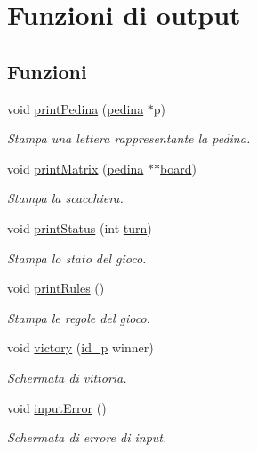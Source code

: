 \hypertarget{group__Output}{}\section{Funzioni di output}
\label{group__Output}
\subsection*{Funzioni}
\begin{DoxyCompactItemize}
\item 
void \hyperlink{group__Output_ga724261d45664de95115edbec3fec7aef}{print\+Pedina} (\hyperlink{ml__lib_8h_a71fee95122b31f5cb0b07d9c16ffa3a5}{pedina} $\ast$p)
\begin{DoxyCompactList}\small\item\em Stampa una lettera rappresentante la pedina. \end{DoxyCompactList}\item 
void \hyperlink{group__Output_gac5423849c2701b9adbd33225a8a20288}{print\+Matrix} (\hyperlink{ml__lib_8h_a71fee95122b31f5cb0b07d9c16ffa3a5}{pedina} $\ast$$\ast$\hyperlink{ml__main_8c_a62a3fe3d1df9ff58883b669f7f24e516}{board})
\begin{DoxyCompactList}\small\item\em Stampa la scacchiera. \end{DoxyCompactList}\item 
void \hyperlink{group__Output_gab1b6c72fb86f8d1c4537fec2456e4c78}{print\+Status} (int \hyperlink{ml__main_8c_aaefa47f4fdf865c2358c22b542a993e4}{turn})
\begin{DoxyCompactList}\small\item\em Stampa lo stato del gioco. \end{DoxyCompactList}\item 
void \hyperlink{group__Output_gafa3767d5c549d555cf1817fe57c614fc}{print\+Rules} ()
\begin{DoxyCompactList}\small\item\em Stampa le regole del gioco. \end{DoxyCompactList}\item 
void \hyperlink{group__Output_ga126ef35a3cacdc550c03a737bf1311bf}{victory} (\hyperlink{ml__lib_8h_a0330ff92cbc796e96c3ce3e4401bf1e1}{id\+\_\+p} winner)
\begin{DoxyCompactList}\small\item\em Schermata di vittoria. \end{DoxyCompactList}\item 
void \hyperlink{group__Output_gac50c67875562e21c46610e2c97525c40}{input\+Error} ()
\begin{DoxyCompactList}\small\item\em Schermata di errore di input. \end{DoxyCompactList}\end{DoxyCompactItemize}


